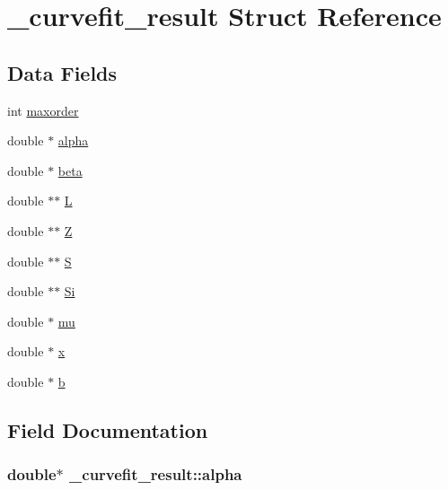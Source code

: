 \hypertarget{struct__curvefit__result}{}\section{\+\_\+curvefit\+\_\+result Struct Reference}
\label{struct__curvefit__result}
\subsection*{Data Fields}
\begin{DoxyCompactItemize}
\item 
int \hyperlink{struct__curvefit__result_ad13ba13973e6cbcaa18a130fffffc51e}{maxorder}
\item 
double $\ast$ \hyperlink{struct__curvefit__result_ab56262b33bcbe8f57c2a1abbdfd2390f}{alpha}
\item 
double $\ast$ \hyperlink{struct__curvefit__result_af944a98599d8267f8aea2ece7d392934}{beta}
\item 
double $\ast$$\ast$ \hyperlink{struct__curvefit__result_a1980f366a2c6b55a90488993ce4ff45f}{L}
\item 
double $\ast$$\ast$ \hyperlink{struct__curvefit__result_a3a16ac20b913a15302777af1c737802e}{Z}
\item 
double $\ast$$\ast$ \hyperlink{struct__curvefit__result_a77d02b3f78f1ad80cccad96f565c62f3}{S}
\item 
double $\ast$$\ast$ \hyperlink{struct__curvefit__result_a98daa734e4c93414381644b5da332785}{Si}
\item 
double $\ast$ \hyperlink{struct__curvefit__result_a383aaa533afdf17d91c26133f629e3e8}{mu}
\item 
double $\ast$ \hyperlink{struct__curvefit__result_a07b7d671ead5f402dd53973dd8095d8e}{x}
\item 
double $\ast$ \hyperlink{struct__curvefit__result_a43187b41a4fec805c76ee32325f4942c}{b}
\end{DoxyCompactItemize}


\subsection{Field Documentation}
\subsubsection[{\texorpdfstring{alpha}{alpha}}]{\setlength{\rightskip}{0pt plus 5cm}double$\ast$ \+\_\+curvefit\+\_\+result\+::alpha}\hypertarget{struct__curvefit__result_ab56262b33bcbe8f57c2a1abbdfd2390f}{}\label{struct__curvefit__result_ab56262b33bcbe8f57c2a1abbdfd2390f}


